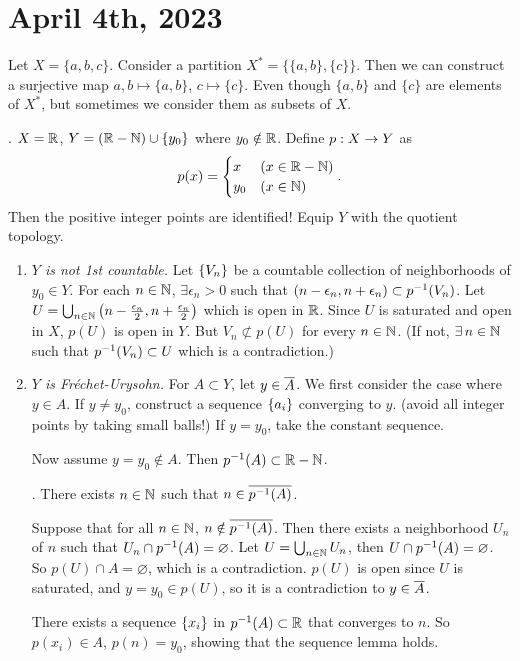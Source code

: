 \section*{April 4th, 2023}

Let \(X = \{a, b, c\}\). Consider a partition \(X^* = \{\{a, b\}, \{c\}\}\). Then we can construct a surjective map \(a, b \mapsto \{a, b\}\), \(c \mapsto \{c\}\). Even though \(\{a, b\}\) and \(\{c\}\) are elements of \(X^*\), but sometimes we consider them as subsets of \(X\).

\ex. \(X = \mathbb{R}\), \(Y = (\mathbb{R} - \mathbb{N}) \cup \{y_0\}\) where \(y_0 \notin \mathbb{R}\). Define \(p : X \rightarrow Y\) as
\[
    p(x) = \begin{cases}
        x & (x \in \mathbb{R} - \mathbb{N}) \\ y_0 & (x \in \mathbb{N})
    \end{cases}.
\]
Then the positive integer points are identified! Equip \(Y\) with the quotient topology.
\begin{enumerate}
    \item \textit{\(Y\) is not 1st countable.} Let \(\left\{ V_n \right\}\) be a countable collection of neighborhoods of \(y_0 \in Y\). For each \(n \in \mathbb{N}\), \(\exists \epsilon_n > 0\) such that \((n - \epsilon_n, n + \epsilon_n) \subset p^{-1}(V_n)\). Let \(U = \bigcup_{n \in \mathbb{N}} \left( n - \frac{\epsilon_n}{2}, n + \frac{\epsilon_n}{2} \right)\) which is open in \(\mathbb{R}\). Since \(U\) is saturated and open in \(X\), \(p(U)\) is open in \(Y\). But \(V_n \not\subset p(U)\) for every \(n \in \mathbb{N}\). (If not, \(\exists n \in \N\) such that \(p^{-1}(V_n) \subset U\) which is a contradiction.)
    \item \textit{\(Y\) is Fréchet-Urysohn.} For \(A \subset Y\), let \(y \in \overline{A}\). We first consider the case where \(y \in A\). If \(y \neq y_0\), construct a sequence \(\left\{ a_i \right\}\) converging to \(y\). (avoid all integer points by taking small balls!) If \(y = y_0\), take the constant sequence.

          Now assume \(y = y_0 \notin A\). Then \(p^{-1}(A) \subset \mathbb{R} - \mathbb{N}\).

          \quad \claim. There exists \(n \in \mathbb{N}\) such that \(n \in \overline{p^{-1}(A)}\).

          \quad \pf Suppose that for all \(n \in \mathbb{N}\), \(n \notin \overline{p^{-1}(A)}\). Then there exists a neighborhood \(U_n\) of \(n\) such that \(U_n \cap p^{-1}(A) = \varnothing\). Let \(U = \bigcup_{n \in \mathbb{N}} U_n\), then \(U \cap p^{-1}(A) = \varnothing\). So \(p(U) \cap A= \varnothing\), which is a contradiction. \(p(U)\) is open since \(U\) is saturated, and \(y = y_0 \in p(U)\), so it is a contradiction to \(y \in \overline{A}\).

          There exists a sequence \(\left\{ x_i \right\}\) in \(p^{-1}(A) \subset \mathbb{R}\) that converges to \(n\). So \(p(x_i) \in A\), \(p(n) = y_0\), showing that the sequence lemma holds.
\end{enumerate}

